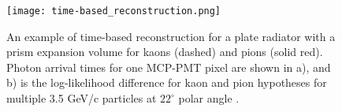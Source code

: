 \begin{figure}[!htb]
	\centering
	\texttt{[image: time-based\_reconstruction.png]}
	\caption{An example of time-based reconstruction for a plate radiator with a prism expansion volume for kaons (dashed) and pions (solid red). Photon arrival times for one MCP-PMT pixel are shown in a), and b) is the log-likelihood difference for kaon and pion hypotheses for multiple 3.5 GeV/c particles at $22^\circ$ polar angle \cite{PANDA_barrel}.}
	\label{fig:time-based_reco}
\end{figure}

